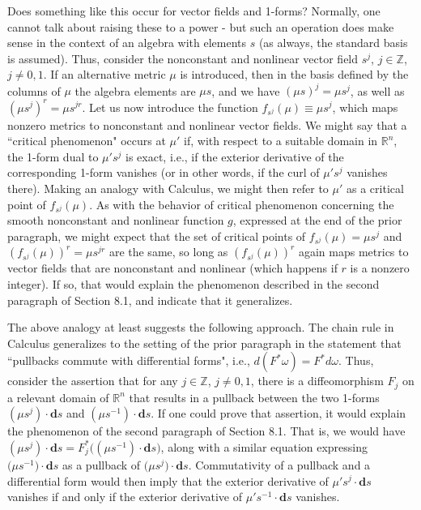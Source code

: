 \documentclass{amsart}
\theoremstyle{definition}
\numberwithin{theorem}{section}
\numberwithin{equation}{section}
\begin{document}
Does something like this occur for vector fields and 1-forms?  Normally, one cannot talk about raising these to a power - but such an operation does make sense in the context of an algebra with elements $s$ (as always, the standard basis is assumed).  Thus, consider the nonconstant and nonlinear vector field $s^j$, $j\in \mathbb{Z}$, \mbox{$j\ne 0,1$}.  If an alternative metric $\mu$ is introduced, 
then in the basis defined by the columns of $\mu$ the algebra elements are $\mu s$, and we have $(\mu s)^j = \mu s^j$, as well as $(\mu s^j)^r = \mu s^{jr}$.
 Let us now introduce the function $f_{s^j}(\mu)\equiv \mu s^j$, which maps nonzero metrics to nonconstant and nonlinear vector fields.  We might say that a ``critical phenomenon" occurs at $\mu'$ if, with respect to a suitable domain in $\mathbb{R}^n$, the 1-form dual to $\mu' s^j$ is exact, i.e., if the exterior derivative of the corresponding 1-form vanishes (or in other words, if the curl of $\mu' s^j$ vanishes there).  Making an analogy with Calculus, we might then refer to $\mu'$ as a critical point of $f_{s^j}(\mu)$.  As with the behavior of critical phenomenon concerning the smooth nonconstant and nonlinear function $g$, expressed  at the end of the prior paragraph, we might expect that the set of critical points of $f_{s^j}(\mu) = \mu s^j$ and $\left(f_{s^j}(\mu)\right)^r = \mu s^{jr}$ are the same, so long as $\left(f_{s^j}(\mu)\right)^r$ again maps metrics to vector fields that are nonconstant and nonlinear (which happens if $r$ is a nonzero integer).  If so, that would explain the phenomenon described in the second paragraph of Section 8.1, and indicate that it generalizes.  

The above analogy at least suggests the following approach.  The chain rule in Calculus generalizes to the setting of the prior paragraph in the statement that ``pullbacks commute with differential forms", i.e., $d(F^*\omega) = F^*d\omega$.  Thus, consider the assertion that for any $j\in \mathbb{Z}$, \mbox{$j\ne 0,1$}, there is a diffeomorphism $F_j$ on a relevant domain of $\mathbb{R}^n$ that results in a pullback between the two 1-forms $(\mu s^j)\cdot \mathbf{d}s$ and $(\mu s^{-1})\cdot \mathbf{d}s$.  If one could prove that assertion, it would explain the phenomenon of the second paragraph of Section 8.1.  That is, we would have $(\mu s^j)\cdot \mathbf{d}s = F_j^* \big((\mu s^{-1})\cdot \mathbf{d}s\big)$, along with a similar equation expressing $\big(\mu s^{-1}\big)\cdot \mathbf{d}s$ as a pullback of $\big(\mu s^j\big)\cdot \mathbf{d}s$.  Commutativity of a pullback and a differential form would then imply that the exterior derivative of $\mu' s^j\cdot \mathbf{d}s$ vanishes if and only if the exterior derivative of $\mu' s^{-1}\cdot \mathbf{d}s$ vanishes.  
\end{document}
